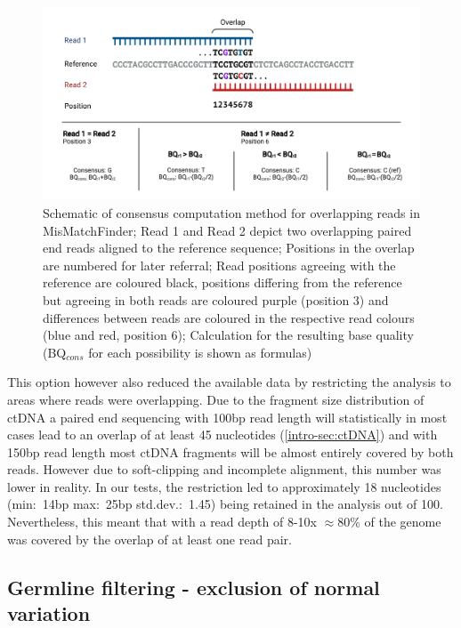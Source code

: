 \begin{figure}[!ht]
\centering
\includegraphics[width=.99\linewidth]{Figures/MisMatchFinder/ConsensusMethodMisMatchFinder.pdf}
\caption[Schematic of consensus computation method for overlapping reads]{Schematic of consensus computation method for overlapping reads in MisMatchFinder; Read 1 and Read 2 depict two overlapping paired end reads aligned to the reference sequence; Positions in the overlap are numbered for later referral; Read positions agreeing with the reference are coloured black, positions differing from the reference but agreeing in both reads are coloured purple (position 3) and differences between reads are coloured in the respective read colours (blue and red, position 6); Calculation for the resulting base quality (BQ$_{cons}$ for each possibility is shown as formulas)}\label{fig:mmf-consensus}
\end{figure}

This option however also reduced the available data by restricting the analysis to areas where reads were overlapping. Due to the fragment size distribution of ctDNA a paired end sequencing with 100bp read length will statistically in most cases lead to an overlap of at least 45 nucleotides (\autoref{intro-sec:ctDNA}) and with 150bp read length most ctDNA fragments will be almost entirely covered by both reads. However due to soft-clipping and incomplete alignment, this number was lower in reality.
In our tests, the restriction led to approximately 18 nucleotides (min:~14bp max:~25bp std.dev.:~1.45) being retained in the analysis out of 100. Nevertheless, this meant that with a read depth of 8-10x $\approx$80\% of the genome was covered by the overlap of at least one read pair.



\subsection[Germline filtering]{Germline filtering - exclusion of normal variation}
\label{mmf-sec:germline}

